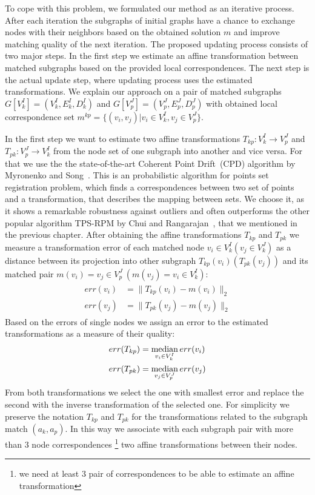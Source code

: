 To cope with this problem, we formulated our method as an iterative process. After each iteration the subgraphs of initial graphs have a chance to exchange nodes with their neighbors based on the obtained solution $m$ and improve matching quality of the next iteration. The proposed updating process consists of two major steps. In the first step we estimate an affine transformation between matched subgraphs based on the provided local correspondences. The next step is the actual update step, where updating process uses the estimated transformations.
We explain our approach on a pair of matched subgraphs $G[V^I_k]=(V^I_k, E^I_k, D^I_k)$ and $G[V^J_p]=(V^J_p, E^J_p, D^J_p)$  with obtained local correspondence set $m^{kp}=\{(v_i,v_j)|v_i\in V^I_k, v_j\in V^J_p\}$. 

In the first step we want to estimate two affine transformations $T_{kp}:V^I_k\rightarrow V^J_p$ and $T_{pk}:V^J_p\rightarrow V^I_k$ from the node set of one subgraph into another and vice versa. For that we use the  the state-of-the-art Coherent Point Drift~(CPD) algorithm by Myronenko and Song~\cite{Myronenko2009_CPD}. This is an probabilistic algorithm for points set registration problem, which finds a correspondences between two set of points and a transformation, that describes the mapping between sets. We choose it, as it shows a remarkable robustness against outliers and often outperforms the other popular algorithm TPS-RPM by Chui and Rangarajan~\cite{Chui2003}, that we mentioned in the previous chapter. After obtaining the affine transformations $T_{kp}$ and $T_{pk}$ we measure a transformation error of each matched node $v_i\in V^I_k (v_j\in V^J_k)$ as a distance between its projection into other subgraph $T_{kp}(v_i) (T_{pk}(v_j))$ and its matched pair $m(v_i) = v_j\in V^J_p\ (m(v_j) = v_i\in V^I_k)$:
\begin{align}\begin{split} \label{eq:err_v}
err(v_i) &= \|T_{kp}(v_i) - m(v_i)\|_{2}\\
err(v_j) &= \|T_{pk}(v_j) - m(v_j)\|_{2}
\end{split}\end{align}
Based on the errors of single nodes we assign an error to the estimated transformations as a measure of their quality:
\begin{equation}\begin{split} \label{eq:err_T}
err(T_{kp}) & = \mathop{\rm median}_{v_i\in V^I_k}err(v_i) \\
err(T_{pk}) & = \mathop{\rm median}_{v_j\in V^J_p}err(v_j)
\end{split}\end{equation}
From both transformations we select the one with smallest error and replace the second with the inverse transformation of the selected one. For simplicity we preserve the notation $T_{kp}$ and $T_{pk}$ for the transformations related to the subgraph match $(a_k, a_p)$. In this way we associate with each subgraph pair with more than $3$ node correspondences \footnote{we need at least $3$ pair of correspondences to be able to estimate an affine transformation} two affine transformations between their nodes.

